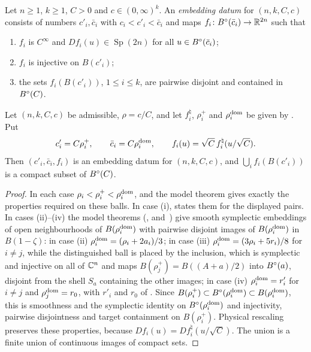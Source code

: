 \begin{definition}\label{def:ham-datum}
Let $n\ge1$, $k\ge1$, $C>0$ and $c\in(0,\infty)^k$. An \emph{embedding datum} for $(n,k,C,c)$ consists of numbers
$c'_i,\bar c_i$ with $c_i<c'_i<\bar c_i$ and maps $f_i\colon B^{\circ}(\bar c_i)\to\mathbb{R}^{2n}$ such that
\begin{enumerate}[label=(\roman*)]
\item $f_i$ is $C^\infty$ and $Df_i(u)\in\operatorname{Sp}(2n)$ for all $u\in B^{\circ}(\bar c_i)$;
\item $f_i$ is injective on $B(c'_i)$;
\item the sets $f_i(B(c'_i))$, $1\le i\le k$, are pairwise disjoint and contained in $B^{\circ}(C)$.
\end{enumerate}
\end{definition}

\begin{proposition}\label{prop:ham-embeddings}
Let $(n,k,C,c)$ be admissible, $\rho=c/C$, and let $f^\natural_i$, $\rho_i^+$ and $\rho_i^{\rm dom}$ be given by
. Put
\[
 c'_i=C\rho_i^+,\qquad \bar c_i=C\rho_i^{\rm dom},\qquad f_i(u)=\sqrt C\,f^\natural_i(u/\sqrt C).
\]
Then $(c'_i,\bar c_i,f_i)$ is an embedding datum for $(n,k,C,c)$, and $\bigcup_if_i(B(c'_i))$ is a compact subset of
$B^{\circ}(C)$.
\end{proposition}

\begin{proof}
In each case $\rho_i<\rho_i^+<\rho_i^{\rm dom}$, and the model theorem gives exactly the properties required on these
balls. In case (i),  states them for the displayed pairs. In cases (ii)--(iv) the model
theorems (,  and~) give smooth symplectic embeddings
of open neighbourhoods of $B(\rho_i^{\rm dom})$ with pairwise disjoint images of $B(\rho_i^{\rm dom})$ in $B(1-\zeta)$: in
case (ii) $\rho_i^{\rm dom}=(\rho_i+2a_i)/3$; in case (iii) $\rho_i^{\rm dom}=(3\rho_i+5r_i)/8$ for $i\ne j$, while the
distinguished ball is placed by the inclusion, which is symplectic and injective on all of $\mathbb{C}^n$ and maps
$B(\rho_j^+)=B((A+a)/2)$ into $B^{\circ}(a)$, disjoint from the shell $S_a$ containing the other images; in case (iv)
$\rho_i^{\rm dom}=r'_i$ for $i\ne j$ and $\rho_j^{\rm dom}=r_0$, with $r'_i$ and $r_0$ of . Since $B(\rho_i^+)\subset B^{\circ}(\rho_i^{\rm dom})\subset B(\rho_i^{\rm dom})$,
this is smoothness and the symplectic identity on $B^{\circ}(\rho_i^{\rm dom})$ and injectivity, pairwise disjointness and
target containment on $B(\rho_i^+)$. Physical rescaling preserves these properties, because
$Df_i(u)=Df_i^\natural(u/\sqrt C)$. The union is a finite union of continuous images of compact sets.
\end{proof}


